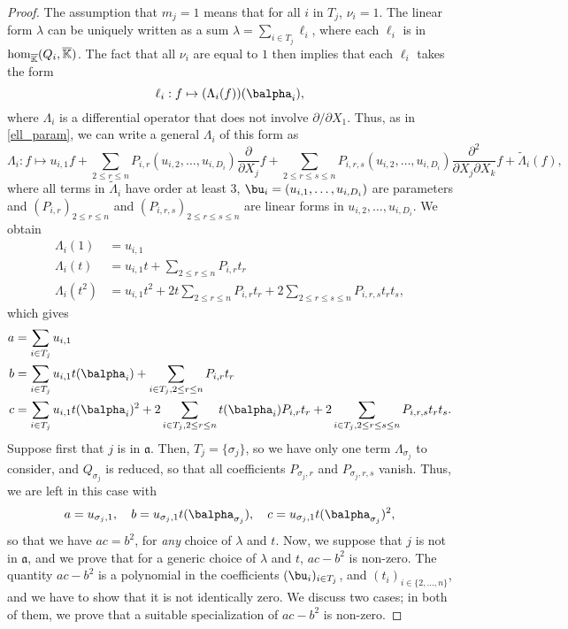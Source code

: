 \documentclass[12pt]{article}
\def\Kbar {{\ensuremath{\overline{\mathbb{K}}}}}
\begin{document}
\begin{proof}
	The assumption that $m_j=1$ means that for all $i$ in $T_j$,
	$\nu_i=1$. The linear 
	form $\lambda$ can be uniquely written as a sum $\lambda=\sum_{i \in T_j}
	\ell_i$, where each $\ell_i$ is in ${\rm hom}_\Kbar(Q_i,\Kbar)$.
	The fact that all $\nu_i$ are equal to $1$ then implies that each $\ell_i$ takes the form 
	$$\ell_i: f \mapsto (\Lambda_{i}(f))(\balpha_i),$$
	where $\Lambda_{i}$ is a differential operator that does not 
	involve $\partial/\partial X_1$. Thus, as in \cref{ell_param}, we can write a general
	$\Lambda_i$ of this form as
	$$\Lambda_i: f \mapsto u_{i,1} f + \sum_{2 \le r \le n}
	P_{i,r}(u_{i,2},\dots,u_{i,D_i}) \frac{\partial}{\partial X_j} f +
	\sum_{2 \le r \le s \le n} P_{i,r,s}(u_{i,2},\dots,u_{i,D_i})
	\frac{\partial^2}{\partial X_j\partial X_k} f +
	\tilde\Lambda_i(f),$$ where all terms in $\tilde \Lambda_i$ have
	order at least $3$, $\bu_i=(u_{i,1},\dots,u_{i,D_i})$ are parameters and
	$(P_{i,r})_{2 \le r \le n}$ and $(P_{i,r,s})_{2 \le r \le s \le n}$
	are linear forms in $u_{i,2},\dots,u_{i,D_i}$.
	We obtain
	\begin{align*}
	\Lambda_i(1)   &= u_{i,1} \\
	\Lambda_i(t)   &= u_{i,1} t +\sum_{2 \le r \le n}P_{i,r}t_r \\
	\Lambda_i(t^2) &= u_{i,1} t^2  +2 t \sum_{2 \le r \le n}P_{i,r}t_r   
	+ 2\sum_{2 \le r \le s \le n} P_{i,r,s}t_rt_s,
	\end{align*}
	which gives
	\begin{align*}
	a  &= \sum_{i\in T_j}u_{i,1} \\
	b  &= \sum_{i\in T_j}u_{i,1} t(\balpha_i) +\sum_{i \in T_j, 2 \le r \le n}P_{i,r}t_r \\
	c &= \sum_{i\in T_j}u_{i,1} t(\balpha_i)^2  +2  \sum_{i \in T_j, 2 \le r \le n}t(\balpha_i) P_{i,r}t_r    
	+2 \sum_{i \in T_j, 2 \le r \le s \le n} P_{i,r,s}t_rt_s.
	\end{align*}
	Suppose first that $j$ is in $\mathfrak{a}$. Then, $T_j=\{\sigma_j\}$, so we 
	have only one term $\Lambda_{\sigma_j}$ to consider, and $Q_{\sigma_j}$ 
	is reduced, so that all coefficients $P_{\sigma_j,r}$ and
	$P_{\sigma_j,r,s}$ vanish. Thus, we are left in
	this case with
	$$
	a = u_{\sigma_j,1}, \quad
	b = u_{\sigma_j,1} t(\balpha_{\sigma_j}), \quad
	c = u_{\sigma_j,1} t(\balpha_{\sigma_j})^2,
	$$ so that we have $ac=b^2$, for {\em any} choice of $\lambda$ and
	$t$. Now, we suppose that $j$ is not in $\mathfrak{a}$, and we prove
	that for a generic choice of $\lambda$ and $t$, $ac-b^2$ is non-zero.
	The quantity $ac-b^2$ is a polynomial in the coefficients
	$(\bu_i)_{i\in T_j}$, and $(t_i)_{i \in \{2,\dots,n\}}$, and we have
	to show that it is not identically zero. We discuss two cases; in both
	of them, we prove that a suitable specialization of $ac-b^2$ is
	non-zero.
	

\end{proof}
\end{document}
